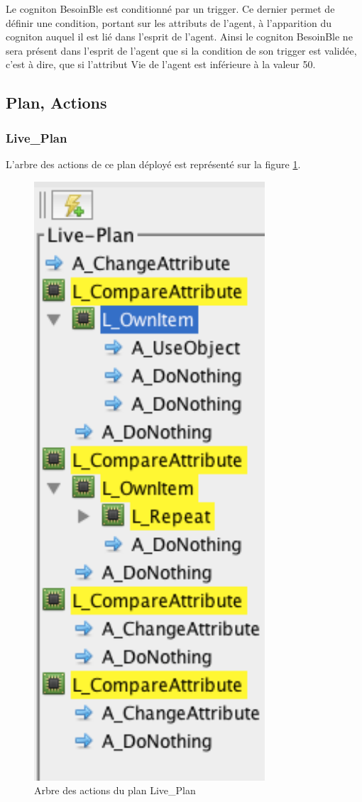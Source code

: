 \documentclass[a4paper,oneside,12 pt]{article}
\begin{document}
Le cogniton BesoinBle est conditionné par un trigger. Ce dernier permet de définir une condition, portant sur les attributs de l'agent, à l'apparition du cogniton auquel il est lié dans l'esprit de l'agent. Ainsi le cogniton BesoinBle ne sera présent dans l'esprit de l'agent 
que si la condition de son trigger est validée, c'est à dire, que si l'attribut Vie de l'agent est inférieure à la valeur 50.

\subsection{Plan, Actions}
\subsubsection{Live\_Plan}
L'arbre des actions de ce plan déployé est représenté sur la figure \ref{PL2}.
\begin{figure}[!ht]
\begin{center}
\includegraphics[scale=0.5]{LivePlan2.pdf}
\caption[PL2]{Arbre des actions du plan Live\_Plan \\}
\label{PL2}
\end{center}
\end{figure} 
\end{document}
